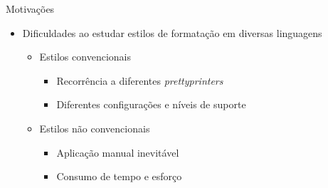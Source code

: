 \documentclass
  [ aspectratio=169,
    english,
    hyperref={citecolor=blue,colorlinks=true,linkcolor=blue,urlcolor=blue},
    brazil]
  {beamer}
\title{\worktitle}
\subtitle{\worksubtitle}
\author{Átila Gama Silva}
\date{\today}
\begin{document}


  \newlength{\halfpart}
  \setlength{\halfpart}{.5\textwidth - .5em}


  \newlength{\halftextwidthplustwoempart}
  \setlength{\halftextwidthplustwoempart}{.5\textwidth + 2em}
  \newlength{\halftextwidthplustwoemcounterpart}
  \setlength{\halftextwidthplustwoemcounterpart}{.5\textwidth - 3em}


  \newlength{\halftextwidthplusfiveempart}
  \setlength{\halftextwidthplusfiveempart}{.5\textwidth + 5em}
  \newlength{\halftextwidthplusfiveemcounterpart}
  \setlength{\halftextwidthplusfiveemcounterpart}{.5\textwidth - 6em}


  \begin{frame}\titlepage\end{frame}


  \begin{frame}{Motivações}
    \begin{itemize}
      \item Dificuldades ao estudar estilos de formatação em diversas linguagens
            \begin{itemize}
              \item Estilos convencionais
                    \begin{itemize}
                      \item Recorrência a diferentes \textit{prettyprinters}
                      \item Diferentes configurações e níveis de suporte
                    \end{itemize}
              \item Estilos não convencionais
                    \begin{itemize}
                      \item Aplicação manual inevitável
                      \item Consumo de tempo e esforço
                    \end{itemize}
            \end{itemize}
    \end{itemize}
  \end{frame}
\end{document}
